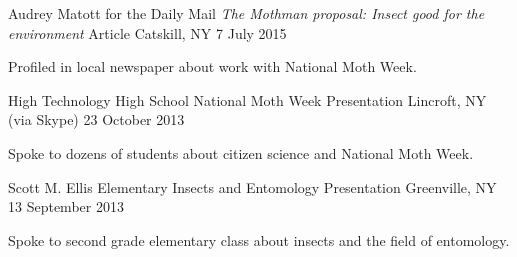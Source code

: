 \begin{cventries}
  \cventry
    {Audrey Matott for the Daily Mail} %
    {\emph{The Mothman proposal: Insect good for the environment} Article} %
    {Catskill, NY} %
    {7 July 2015} %
    {
      \begin{cvitems} %
        \item {Profiled in local newspaper about work with National Moth Week.}
      \end{cvitems}
    }

  \cventry
    {High Technology High School} %
    {National Moth Week Presentation} %
    {Lincroft, NY (via Skype)} %
    {23 October 2013} %
    {
      \begin{cvitems} %
        \item {Spoke to dozens of students about citizen science and National Moth Week.}
      \end{cvitems}
    }

  \cventry
    {Scott M. Ellis Elementary} %
    {Insects and Entomology Presentation} %
    {Greenville, NY} %
    {13 September 2013} %
    {
      \begin{cvitems} %
        \item {Spoke to second grade elementary class about insects and the field of entomology.}
      \end{cvitems}
    }

\end{cventries}
